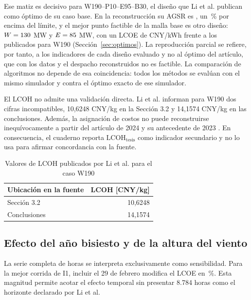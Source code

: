 Ese matiz es decisivo para W190--P10--E95--B30, el diseño que Li et al. publican como óptimo de su caso base. En la reconstrucción su AGSR es \ReproOptimumAGSR, un \ReproOptimumExcessPct\,\% por encima del límite, y el mejor punto factible de la malla base es otro diseño: $W=130$ MW y $E=85$ MW, con un LCOE de \BaseBestLCOE{} CNY/kWh frente a los \ReproOptimumPublishedLCOE{} publicados para W190 (Sección~\ref{sec:optimos}). La reproducción parcial se refiere, por tanto, a los indicadores de cada diseño evaluado y no al óptimo del artículo, que con los datos y el despacho reconstruidos no es factible. La comparación de algoritmos no depende de esa coincidencia: todos los métodos se evalúan con el mismo simulador y contra el óptimo exacto de ese simulador.

El LCOH no admite una validación directa. Li et al. informan para W190 dos cifras incompatibles, 10,6248 CNY/kg en la Sección 3.2 y 14,1574 CNY/kg en las conclusiones. Además, la asignación de costos no puede reconstruirse inequívocamente a partir del artículo de 2024 y su antecedente de 2023 \cite{Li2023TechnoEconomic}. En consecuencia, el cuaderno reporta $\mathrm{LCOH}_{\mathrm{tesis}}$ como indicador secundario y no lo usa para afirmar concordancia con la fuente.

\begin{table}[H]
\centering
\footnotesize
\caption{Valores de LCOH publicados por Li et al. para el caso W190}
\label{tab:lcoh_inconsistente}
\begin{tabular}{l r}
\hline
\textbf{Ubicación en la fuente} & \textbf{LCOH [CNY/kg]} \\
\hline
Sección 3.2 & 10,6248 \\
Conclusiones & 14,1574 \\
\hline
\end{tabular}
\end{table}

\subsection{Efecto del año bisiesto y de la altura del viento}
\label{sec:sens_horizonte}

\TablaHorizonteAuto

La serie completa de \HoursSensitivity{} horas se interpreta exclusivamente como sensibilidad. Para la mejor corrida de I1, incluir el 29 de febrero modifica el LCOE en \BestHorizonDeltaPct\,\%. Esta magnitud permite acotar el efecto temporal sin presentar 8.784 horas como el horizonte declarado por Li et al.


